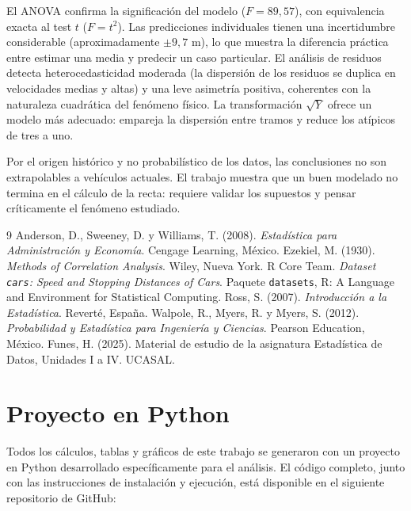 \documentclass[12pt,a4paper]{article}
\begin{document}
El ANOVA confirma la significación del modelo ($F = 89{,}57$), con equivalencia exacta al test $t$ ($F = t^2$). Las predicciones individuales tienen una incertidumbre considerable (aproximadamente $\pm 9{,}7$ m), lo que muestra la diferencia práctica entre estimar una media y predecir un caso particular. El análisis de residuos detecta heterocedasticidad moderada (la dispersión de los residuos se duplica en velocidades medias y altas) y una leve asimetría positiva, coherentes con la naturaleza cuadrática del fenómeno físico. La transformación $\sqrt{Y}$ ofrece un modelo más adecuado: empareja la dispersión entre tramos y reduce los atípicos de tres a uno.

Por el origen histórico y no probabilístico de los datos, las conclusiones no son extrapolables a vehículos actuales. El trabajo muestra que un buen modelado no termina en el cálculo de la recta: requiere validar los supuestos y pensar críticamente el fenómeno estudiado.


\begin{thebibliography}{9}
 Anderson, D., Sweeney, D. y Williams, T. (2008). \textit{Estadística para Administración y Economía}. Cengage Learning, México.
 Ezekiel, M. (1930). \textit{Methods of Correlation Analysis}. Wiley, Nueva York.
 R Core Team. \textit{Dataset \texttt{cars}: Speed and Stopping Distances of Cars}. Paquete \texttt{datasets}, R: A Language and Environment for Statistical Computing.
 Ross, S. (2007). \textit{Introducción a la Estadística}. Reverté, España.
 Walpole, R., Myers, R. y Myers, S. (2012). \textit{Probabilidad y Estadística para Ingeniería y Ciencias}. Pearson Education, México.
 Funes, H. (2025). Material de estudio de la asignatura Estadística de Datos, Unidades I a IV. UCASAL.
\end{thebibliography}

\appendix
\section{Proyecto en Python}
\label{sec:proyecto}

Todos los cálculos, tablas y gráficos de este trabajo se generaron con un proyecto en Python desarrollado específicamente para el análisis. El código completo, junto con las instrucciones de instalación y ejecución, está disponible en el siguiente repositorio de GitHub:
\end{document}
